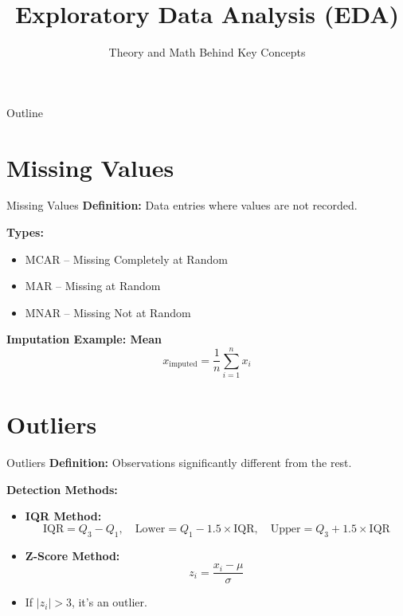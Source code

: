 \documentclass{beamer}
\title{Exploratory Data Analysis (EDA)}
\subtitle{Theory and Math Behind Key Concepts}
\date{}
\begin{document}
{
\begin{frame}
    \titlepage
\end{frame}
}
\begin{frame}{Outline}
    \tableofcontents
\end{frame}

\section{Missing Values}
\begin{frame}{Missing Values}
\textbf{Definition:} Data entries where values are not recorded. \medskip

\textbf{Types:}
\begin{itemize}
    \item MCAR – Missing Completely at Random
    \item MAR – Missing at Random
    \item MNAR – Missing Not at Random
\end{itemize}

\textbf{Imputation Example: Mean}
\[
x_{\text{imputed}} = \frac{1}{n} \sum_{i=1}^{n} x_i
\]
\end{frame}

\section{Outliers}
\begin{frame}{Outliers}
\textbf{Definition:} Observations significantly different from the rest.

\textbf{Detection Methods:}
\begin{itemize}
    \item \textbf{IQR Method:}
    \[
    \text{IQR} = Q_3 - Q_1,\quad 
    \text{Lower} = Q_1 - 1.5 \times \text{IQR},\quad
    \text{Upper} = Q_3 + 1.5 \times \text{IQR}
    \]
    \item \textbf{Z-Score Method:}
    \[
    z_i = \frac{x_i - \mu}{\sigma}
    \]
    \item If \( |z_i| > 3 \), it's an outlier.
\end{itemize}
\end{frame}

\end{document}
